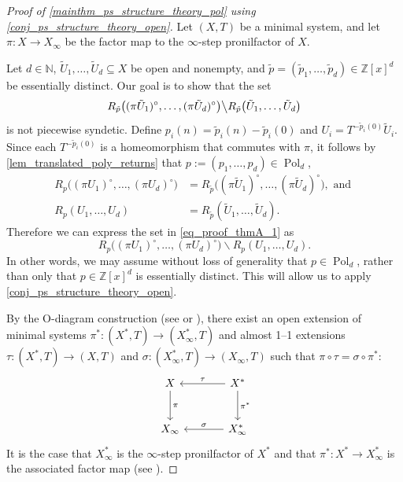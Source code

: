 \documentclass{article}
\theoremstyle{plain}
\theoremstyle{claim}
\theoremstyle{definition}
\theoremstyle{plain}
\theoremstyle{plain}
\newcommand{\N}{\mathbb{N}}
\newcommand{\Z}{\mathbb{Z}}
\newcommand{\Pol}{\operatorname{Pol}}
\renewcommand{\setminus}{\backslash}
\newcommand{\1}{\boldsymbol{1}}
\begin{document}
\begin{proof}[Proof of \cref{mainthm_ps_structure_theory_pol} using \cref{conj_ps_structure_theory_open}]
    Let $(X,T)$ be a minimal system, and let $\pi: X \to X_\infty$ be the factor map to the $\infty$-step pronilfactor of $X$.
    
    Let $d \in \N$, $\tilde U_1, \ldots, \tilde U_d \subseteq X$ be open and nonempty, and $\tilde p = (\tilde p_1,\ldots,\tilde p_d) \in \Z[x]^d$ be essentially distinct.
    Our goal is to show that the set
    \begin{equation}\label{eq_proof_thmA_1}
        R_{\tilde p}\big((\pi \tilde U_1)^\circ,\dots,(\pi \tilde U_d)^\circ\big) \big\setminus R_{\tilde p}\big(\tilde U_1,\dots,\tilde U_d\big)
    \end{equation}
    is not piecewise syndetic.  Define $p_i(n) = \tilde p_i(n)-\tilde p_i(0)$ and $U_i = T^{-\tilde p_i(0)}\tilde U_i$.
    Since each $T^{-\tilde p_i(0)}$ is a homeomorphism that commutes with $\pi$, it follows by \cref{lem_translated_poly_returns} that $p:=(p_1,\dots,p_d)\in\Pol_d$, 
    \begin{align*}
        R_p\big((\pi U_1)^\circ,\dots,(\pi U_d)^\circ\big) &= R_{\tilde p}\big((\pi \tilde U_1)^\circ,\dots,(\pi \tilde U_d)^\circ\big),
    \text{ and } \\
    R_p(U_1,\dots,U_d) &= R_{\tilde p}(\tilde U_1,\dots,\tilde U_d).
    \end{align*}
    Therefore we can express the set in \eqref{eq_proof_thmA_1} as
    \[
    R_p\big((\pi U_1)^\circ,\dots,(\pi U_d)^\circ \big)\setminus R_p(U_1,\dots,U_d).
    \]
    In other words, we may assume without loss of generality that $p\in\Pol_d$, rather than only that $p\in\Z[x]^d$ is essentially distinct.  This will allow us to apply \cref{conj_ps_structure_theory_open}.
    
    By the O-diagram construction (see \cite[Theorem~3.1]{Veech-pointDistalFlow} or \cite[Theorem~2.19]{glasner_huang_shao_weiss_ye_2020}), there exist an open extension of minimal systems $\pi^*: (X^*, T) \to (X_\infty^*, T)$ and almost 1--1 extensions $\tau: (X^*, T) \to (X,T)$ and $\sigma: (X_\infty^*, T) \to (X_\infty,T)$ such that $\pi \circ \tau = \sigma \circ \pi^*$:
    \begin{equation}
    \label{tikz_comm_diagram}
        \begin{tikzcd}[row sep = large, column sep = large]
            X \ar[r, leftarrow, "\tau"] \ar[d, rightarrow, "\pi"] &  X^* \ar[d, rightarrow, "\pi^*"]\\
            X_{\infty} \ar[r, leftarrow, "\sigma"] & X_{\infty}^*
        \end{tikzcd}
    \end{equation}
    It is the case that $X^*_\infty$ is the $\infty$-step pronilfactor of $X^*$ and that $\pi^*: X^* \to X^*_\infty$ is the associated factor map (see \cite[Lemma 5.6]{glasner_huang_shao_weiss_ye_2020}).
   

\end{proof}
\end{document}
